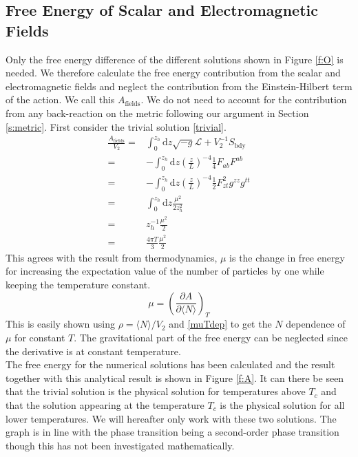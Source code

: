 \documentclass[12pt]{report}
\renewcommand{\d}{\ensuremath{\mathrm{d}}}
\renewcommand{\L}{\ensuremath{\mathcal{L}}}
\begin{document}
\subsection{Free Energy of Scalar and Electromagnetic Fields}
Only the free energy difference of the different solutions shown in Figure \ref{f:O} is needed. We therefore calculate the free energy contribution from the scalar and electromagnetic fields and neglect the contribution from the Einstein-Hilbert term of the action. We call this $A_\mathrm{fields}$. We do not need to account for the contribution from any back-reaction on the metric following our argument in Section \ref{s:metric}. First consider the trivial solution \eqref{trivial}.
\begin{equation}
\begin{split}
 \frac{A_\mathrm{fields}}{V_\mathrm{2}}=&\int_0^{z_h}\d z \sqrt{-g}\L+V_\mathrm{2}^{-1}S_{\mathrm{bdy}}\\
=&-\int_0^{z_h}\d z \left(\frac{z}{L}\right)^{-4}\frac{1}{4}F_{ab}F^{ab}\\
=&-\int_0^{z_h}\d z \left(\frac{z}{L}\right)^{-4}\frac{1}{2}F_{zt}^2g^{zz}g^{tt}\\
=&\int_0^{z_h}\d z \frac{\mu^2}{2z_h^2}\\
=&z_h^{-1}\frac{\mu^2}{2}\\
=&\frac{4\pi T}{3}\frac{\mu^2}{2}
\end{split}
\end{equation}
This agrees with the result from thermodynamics, $\mu$ is the change in free energy for increasing the expectation value of the number of particles by one while keeping the temperature constant.
\begin{equation}
 \mu=\left(\frac{\partial A}{\partial \langle N \rangle}\right)_T
\end{equation}
This is easily shown using $\rho=\langle N\rangle/V_\mathrm{2}$ and \eqref{muTdep} to get the $N$ dependence of $\mu$ for constant $T$. The gravitational part of the free energy can be neglected since the derivative is at constant temperature.\\

The free energy for the numerical solutions has been calculated and the result together with this analytical result is shown in Figure \ref{f:A}. It can there be seen that the trivial solution is the physical solution for temperatures above $T_c$ and that the solution appearing at the temperature $T_c$ is the physical solution for all lower temperatures. We will hereafter only work with these two solutions. The graph is in line with the phase transition being a second-order phase transition though this has not been investigated mathematically.
\end{document}
